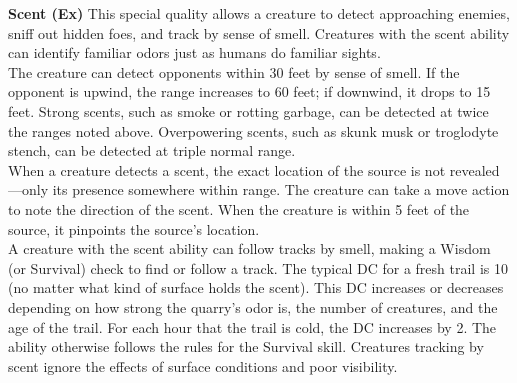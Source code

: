 \textbf{Scent (Ex)} This special quality allows a creature to detect approaching enemies, sniff out hidden foes, and track by sense of smell. Creatures with the scent ability can identify familiar odors just as humans do familiar sights. \\

The creature can detect opponents within 30 feet by sense of smell. If the opponent is upwind, the range increases to 60 feet; if downwind, it drops to 15 feet. Strong scents, such as smoke or rotting garbage, can be detected at twice the ranges noted above. Overpowering scents, such as skunk musk or troglodyte stench, can be detected at triple normal range. \\

When a creature detects a scent, the exact location of the source is not revealed—only its presence somewhere within range. The creature can take a move action to note the direction of the scent. When the creature is within 5 feet of the source, it pinpoints the source's location. \\

A creature with the scent ability can follow tracks by smell, making a Wisdom (or Survival) check to find or follow a track. The typical DC for a fresh trail is 10 (no matter what kind of surface holds the scent). This DC increases or decreases depending on how strong the quarry's odor is, the number of creatures, and the age of the trail. For each hour that the trail is cold, the DC increases by 2. The ability otherwise follows the rules for the Survival skill. Creatures tracking by scent ignore the effects of surface conditions and poor visibility. \\
